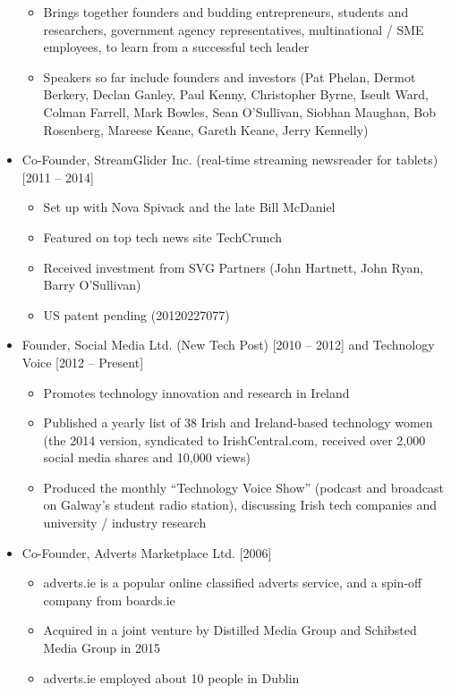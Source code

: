\documentclass[10pt,a4paper]{res} %
\begin{document}
\begin{resume}
\begin{itemize}
\begin{itemize}
\item Brings together founders and budding entrepreneurs, students and researchers, government agency representatives, multinational / SME employees, to learn from a successful tech leader
\item Speakers so far include founders and investors (Pat Phelan, Dermot Berkery, Declan Ganley, Paul Kenny, Christopher Byrne, Iseult Ward, Colman Farrell, Mark Bowles, Sean O'Sullivan, Siobhan Maughan, Bob Rosenberg, Mareese Keane, Gareth Keane, Jerry Kennelly)
\end{itemize}
\item Co-Founder, StreamGlider Inc. (real-time streaming newsreader for tablets) [2011 -- 2014]
\begin{itemize} \itemsep -2pt
\item Set up with Nova Spivack and the late Bill McDaniel
\item Featured on top tech news site TechCrunch
\item Received investment from SVG Partners (John Hartnett, John Ryan, Barry O'Sullivan)
\item US patent pending (20120227077)
\end{itemize}
\item Founder, Social Media Ltd. (New Tech Post) [2010 -- 2012] and Technology Voice [2012 -- Present]
\begin{itemize} \itemsep -2pt
\item Promotes technology innovation and research in Ireland
\item Published a yearly list of 38 Irish and Ireland-based technology women (the 2014 version, syndicated to IrishCentral.com, received over 2,000 social media shares and 10,000 views)
\item Produced the monthly ``Technology Voice Show'' (podcast and broadcast on Galway's student radio station), discussing Irish tech companies and university / industry research
\end{itemize}
\item Co-Founder, Adverts Marketplace Ltd. [2006]
\begin{itemize} \itemsep -2pt
\item adverts.ie is a popular online classified adverts service, and a spin-off company from boards.ie
\item Acquired in a joint venture by Distilled Media Group and Schibsted Media Group in 2015
\item adverts.ie employed about 10 people in Dublin
\end{itemize}

\end{itemize}
\end{resume}
\end{document}
